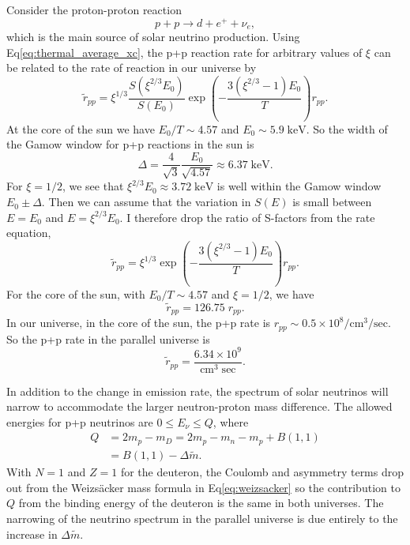 \documentclass[%
 reprint,
 amsmath,amssymb,
 aps,
]{revtex4-1}
\begin{document}
Consider the proton-proton reaction
\begin{equation}
    p + p \rightarrow d + e^{+} + \nu_e,
\end{equation}
which is the main source of solar neutrino production. Using Eq\eqref{eq:thermal_average_xc}, the p+p reaction rate for arbitrary values of $\xi$ can be related to the rate of reaction in our universe by
\begin{equation}
    \widetilde{r}_{pp} = \xi^{1/3} \frac{S(\xi^{2/3} E_0)}{S(E_0)}
    \exp \left( - \frac{3 (\xi^{2/3} - 1) E_0}{T} \right)
    r_{pp}.
\end{equation}
At the core of the sun we have $E_0 / T \sim 4.57$ and $E_0 \sim 5.9 \; \text{keV}$.\cite{HaxtonLectureNotes}
So the width of the Gamow window for p+p reactions in the sun is
\begin{equation}
    \Delta = \frac{4}{\sqrt{3}} \frac{E_0}{\sqrt{4.57}}
    \approx 6.37 \; \text{keV}.
\end{equation}
For $\xi = 1/2$, we see that $\xi^{2/3} E_0 \approx 3.72 \; \text{keV}$ is well within the Gamow window $E_0 \pm \Delta$. Then we can assume that the variation in $S(E)$ is small between $E = E_0$ and $E = \xi^{2/3} E_0$. I therefore drop the ratio of S-factors from the rate equation,
\begin{equation}
    \widetilde{r}_{pp} = \xi^{1/3}
    \exp \left( - \frac{3 (\xi^{2/3} - 1) E_0}{T} \right)
    r_{pp}.
\end{equation}
For the core of the sun, with $E_0 / T \sim 4.57$ and $\xi = 1/2$, we have
\begin{equation}
    \widetilde{r}_{pp} = 126.75 \; r_{pp}.
    \label{eq:rpp_ratio}
\end{equation}
In our universe, in the core of the sun, the p+p rate is $r_{pp} \sim 0.5 \times 10^8 / \text{cm}^3 / \text{sec}$.\cite{HaxtonLectureNotes} So the p+p rate in the parallel universe is
\begin{equation}
    \widetilde{r}_{pp} = \frac{6.34 \times 10^9}{\text{cm}^3 \; \text{sec}}.
\end{equation}

In addition to the change in emission rate, the spectrum of solar neutrinos will narrow to accommodate the larger neutron-proton mass difference. The allowed energies for p+p neutrinos are $0 \le E_\nu \le Q$, where
\begin{align}
	Q &= 2 m_p - m_D = 2 m_p - m_n - m_p + B(1, 1) \\
	&= B(1, 1) - \Delta \widetilde{m}.
\end{align}
With $N = 1$ and $Z = 1$ for the deuteron, the Coulomb and asymmetry terms drop out from the Weizs\"acker mass formula in Eq\eqref{eq:weizsacker} so the contribution to $Q$ from the binding energy of the deuteron is the same in both universes. The narrowing of the neutrino spectrum in the parallel universe is due entirely to the increase in $\Delta \widetilde{m}$.
\end{document}
